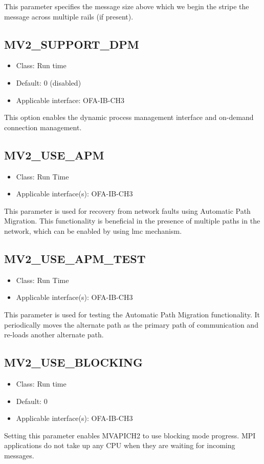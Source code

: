 This parameter specifies the message size above which we begin the stripe the
message across multiple rails (if present).

\subsection{MV2\_SUPPORT\_DPM}
\label{def:support-dpm}

\begin{itemize}
	\item Class: Run time
	\item Default: 0 (disabled)
	\item Applicable interface: OFA-IB-CH3
\end{itemize}

This option enables the dynamic process management interface and on-demand connection
management.

\subsection{MV2\_USE\_APM}
\label{def:mv2-use-apm}
\begin{itemize}
	\item Class: Run Time
	\item Applicable interface(s): OFA-IB-CH3
\end{itemize}

This parameter is used for recovery from network faults using Automatic
Path Migration. This functionality is beneficial in the presence of
multiple paths in the network, which can be enabled by using lmc
mechanism. 

\subsection{MV2\_USE\_APM\_TEST}
\label{def:mv2-use-apm-test}
\begin{itemize}
	\item Class: Run Time
	\item Applicable interface(s): OFA-IB-CH3
\end{itemize}

This parameter is used for testing the Automatic Path Migration
functionality. It periodically moves the alternate path as the primary
path of communication and re-loads another alternate path.


\subsection{MV2\_USE\_BLOCKING}
\begin{itemize}
    \item Class: Run time
    \item Default: 0
    \item Applicable interface(s): OFA-IB-CH3
\end{itemize}
Setting this parameter enables MVAPICH2 to use blocking mode progress.
MPI applications do not take up any CPU when they are waiting for
incoming messages.


